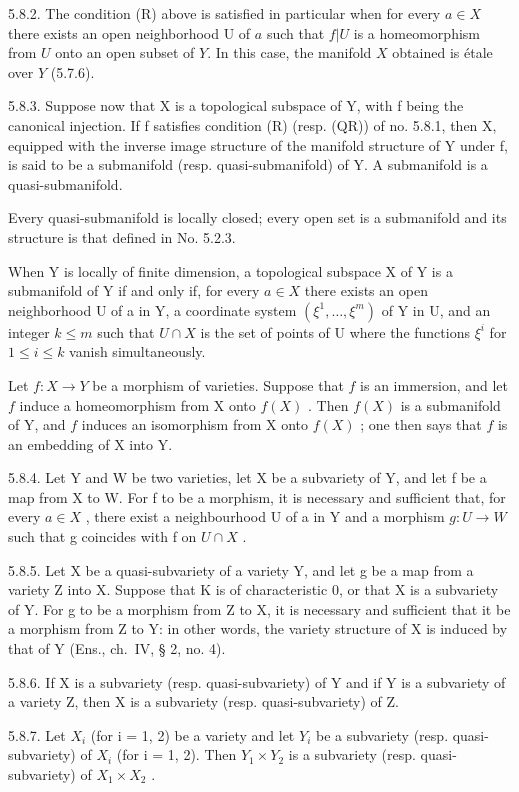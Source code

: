 5.8.2. The condition (R) above is satisfied in particular when for every \(a \in X\) there exists an open neighborhood U of \(a\) such that \(f|U\) is a homeomorphism from \(U\) onto an open subset of \(Y\). In this case, the manifold \(X\) obtained is étale over \(Y\) (5.7.6).

5.8.3. Suppose now that X is a topological subspace of Y, with f being the canonical injection. If f satisfies condition (R) (resp. (QR)) of no. 5.8.1, then X, equipped with the inverse image structure of the manifold structure of Y under f, is said to be a submanifold (resp. quasi-submanifold) of Y. A submanifold is a quasi-submanifold.

Every quasi-submanifold is locally closed; every open set is a submanifold and its structure is that defined in No. 5.2.3.

When Y is locally of finite dimension, a topological subspace X of Y is a submanifold of Y if and only if, for every \(a \in X\) there exists an open neighborhood U of a in Y, a coordinate system \((\xi^{1}, \ldots, \xi^{m})\) of Y in U, and an integer \(k \leqslant m\) such that \(U \cap X\) is the set of points of U where the functions \(\xi^{i}\) for \(1 \leqslant i \leqslant k\) vanish simultaneously.

Let \(f:X\to Y\) be a morphism of varieties. Suppose that \(f\) is an immersion, and let \(f\) induce a homeomorphism from X onto \(f(X)\) . Then \(f(X)\) is a submanifold of Y, and \(f\) induces an isomorphism from X onto \(f(X)\) ; one then says that \(f\) is an embedding of X into Y.

5.8.4. Let Y and W be two varieties, let X be a subvariety of Y, and let f be a map from X to W. For f to be a morphism, it is necessary and sufficient that, for every \(a \in X\) , there exist a neighbourhood U of a in Y and a morphism \(g : U \to W\) such that g coincides with f on \(U \cap X\) .

5.8.5. Let X be a quasi-subvariety of a variety Y, and let g be a map from a variety Z into X. Suppose that K is of characteristic 0, or that X is a subvariety of Y. For g to be a morphism from Z to X, it is necessary and sufficient that it be a morphism from Z to Y: in other words, the variety structure of X is induced by that of Y (Ens., ch.~IV, § 2, no. 4).

5.8.6. If X is a subvariety (resp. quasi-subvariety) of Y and if Y is a subvariety of a variety Z, then X is a subvariety (resp. quasi-subvariety) of Z.

5.8.7. Let \(X_{i}\) (for i = 1, 2) be a variety and let \(Y_{i}\) be a subvariety (resp. quasi-subvariety) of \(X_{i}\) (for i = 1, 2). Then \(Y_{1} \times Y_{2}\) is a subvariety (resp. quasi-subvariety) of \(X_{1} \times X_{2}\) .

